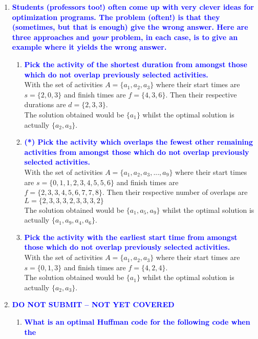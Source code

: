 \documentclass[11pt]{article}
\begin{document}
\begin{enumerate}
\item \textbf{\textcolor{blue}{Students (professors too!) often come up with very clever ideas for
optimization programs.  The problem (often!) is that they (sometimes, but that
is enough) give the wrong answer.  Here are three approaches and {\em your} problem,
in each case, is to give an example where it yields the wrong answer.}}
    \begin{enumerate}
    \item \textbf{\textcolor{blue}{Pick the activity of the shortest duration 
    from amongst those which do not overlap previously selected activities.}}
        \\ With the set of activities $A = \{a_1, a_2, a_3\}$ where their start times are $s = \{2, 0, 3\}$ and finish times are $f = \{4, 3, 6\}$. Then their respective durations are $d = \{2, 3, 3\}$.
        \\ The solution obtained would be $\{a_1\}$ whilst the optimal solution is actually $\{a_2, a_3\}$.
    \item \textbf{\textcolor{blue}{(*) Pick the activity which overlaps the fewest other remaining activities
    from amongst those which do not overlap previously selected activities.}}
        \\ With the set of activities $A = \{a_1, a_2, a_3, ..., a_9\}$ where their start times are $s = \{0, 1, 1, 2, 3, 4, 5, 5, 6\}$ and finish times are $f = \{2, 3, 3, 4, 5, 6, 7, 7, 8\}$. Then their respective number of overlaps are $L = \{2, 3, 3, 3, 2, 3, 3, 3, 2\}$
        \\ The solution obtained would be $\{a_1, a_5, a_9\}$ whilst the optimal solution is actually $\{a_1, a_9, a_4, a_6\}$.
    \item \textbf{\textcolor{blue}{Pick the activity with the earliest start time
    from amongst those which do not overlap previously selected activities.}}
        \\ With the set of activities $A = \{a_1, a_2, a_3\}$ where their start times are $s = \{0, 1, 3\}$ and finish times are $f = \{4, 2, 4\}$.
        \\ The solution obtained would be $\{a_1\}$ whilst the optimal solution is actually $\{a_2, a_3\}$.
    \end{enumerate}
\item \textbf{\textcolor{blue}{{\bf DO NOT SUBMIT -- NOT YET COVERED}}}
    \begin{enumerate}
    \item \textbf{\textcolor{blue}{What is an optimal Huffman code for the following code when the
}}
\end{enumerate}
\end{enumerate}
\end{document}
